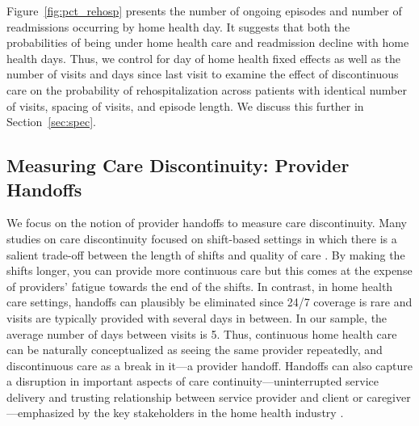 \documentclass[final,12pt, notitlepage]{article}
\begin{document}
Figure~\ref{fig:pct_rehosp} presents the number of ongoing episodes and number of readmissions occurring by home health day.
It suggests that both the probabilities of being under home health care and readmission decline with home health days. Thus, we control for day of home health fixed effects as well as the number of visits and days since last visit to examine the effect of discontinuous care on the probability of rehospitalization across patients with identical number of visits, spacing of visits, and episode length. We discuss this further in Section~\ref{sec:spec}.


\subsection{Measuring Care Discontinuity: Provider Handoffs}\label{sec:measure_handoff}

We focus on the notion of provider handoffs to measure care discontinuity. Many studies on care discontinuity focused on shift-based settings in which there is a salient trade-off between the length of shifts and quality of care \citep{Laine1993, Petersen1994, Riesenberg2009, Brachet2012}.
By making the shifts longer, you can provide more continuous care but this comes at the expense of providers' fatigue towards the end of the shifts. In contrast, in home health care settings, handoffs can plausibly be eliminated since 24/7 coverage is rare and visits are typically provided with several days in between.
In our sample, the average number of days between visits is 5.
Thus, continuous home health care can be naturally conceptualized as seeing the same provider repeatedly, and discontinuous care as a break in it---a provider handoff.
Handoffs can also capture a disruption in important aspects of care continuity---uninterrupted service delivery and trusting relationship between service provider and client or caregiver---emphasized by the key stakeholders in the home health industry \citep{Woodward2004}.
\end{document}
